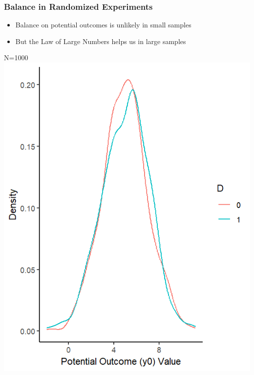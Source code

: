 \documentclass[xcolor=x11names,compress]{beamer}\usepackage[]{graphicx}\usepackage[]{color}
\makeatletter
\def\maxwidth{ %
  \ifdim\Gin@nat@width>\linewidth
    \linewidth
  \else
    \Gin@nat@width
  \fi
}
\newenvironment{knitrout}{}{} %
\renewcommand{\(}{\begin{columns}}
\renewcommand{\)}{\end{columns}}
\newcommand{\<}[1]{\begin{column}{#1}}
\renewcommand{\>}{\end{column}}
\makeatother
\begin{document}
\begin{frame}
\frametitle{Balance in Randomized Experiments}
\begin{multicols}{2}
\begin{itemize}
\item Balance on potential outcomes is unlikely in small samples
\item But the Law of Large Numbers helps us in large samples
\end{itemize}
\columnbreak
N=1000
\begin{knitrout}
\color{fgcolor}
\includegraphics[width=\maxwidth]{figure/balance_N6-1} 

\end{knitrout}
\end{multicols}
\end{frame}
\end{document}
